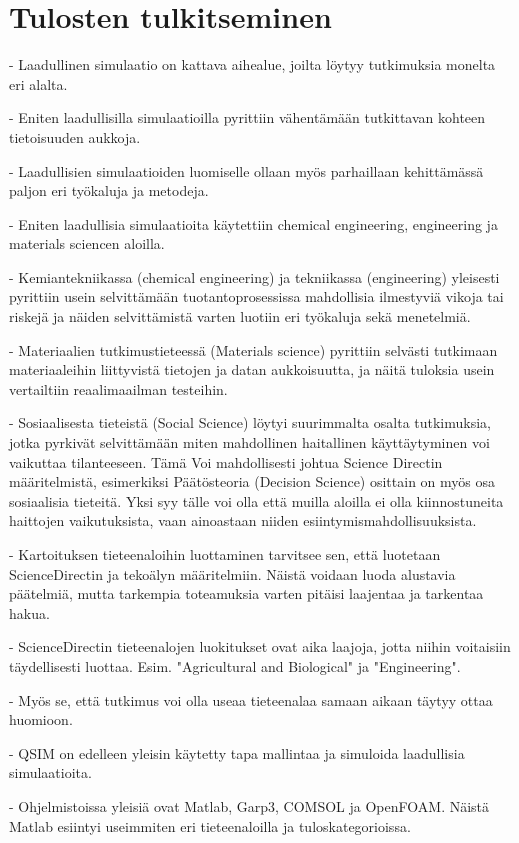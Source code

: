 \documentclass[utf8]{gradu3}
\begin{document}
\chapter{Tulosten tulkitseminen}
- Laadullinen simulaatio on kattava aihealue, joilta löytyy tutkimuksia monelta eri alalta.

- Eniten laadullisilla simulaatioilla pyrittiin vähentämään tutkittavan kohteen tietoisuuden
aukkoja.

- Laadullisien simulaatioiden luomiselle ollaan myös parhaillaan kehittämässä paljon eri 
työkaluja ja metodeja.

- Eniten laadullisia simulaatioita käytettiin chemical engineering, engineering ja materials sciencen aloilla.

- Kemiantekniikassa (chemical engineering) ja tekniikassa (engineering) yleisesti 
pyrittiin usein selvittämään tuotantoprosessissa  mahdollisia ilmestyviä vikoja tai riskejä 
ja näiden selvittämistä varten luotiin eri työkaluja sekä menetelmiä.

- Materiaalien tutkimustieteessä (Materials science) pyrittiin selvästi 
tutkimaan materiaaleihin  liittyvistä tietojen ja datan aukkoisuutta, ja näitä tuloksia usein 
vertailtiin reaalimaailman testeihin.

- Sosiaalisesta tieteistä (Social Science) löytyi suurimmalta osalta tutkimuksia, 
jotka pyrkivät selvittämään miten mahdollinen haitallinen käyttäytyminen voi vaikuttaa
tilanteeseen. Tämä Voi mahdollisesti johtua Science Directin määritelmistä, esimerkiksi
Päätösteoria (Decision Science) osittain on myös osa sosiaalisia tieteitä. 
Yksi syy tälle voi olla että muilla aloilla ei olla kiinnostuneita haittojen vaikutuksista,
vaan ainoastaan niiden esiintymismahdollisuuksista.

- Kartoituksen tieteenaloihin luottaminen tarvitsee sen, että luotetaan ScienceDirectin 
ja tekoälyn määritelmiin. Näistä voidaan luoda alustavia päätelmiä, mutta tarkempia
toteamuksia varten pitäisi laajentaa ja tarkentaa hakua.

- ScienceDirectin tieteenalojen luokitukset ovat aika laajoja, jotta niihin voitaisiin 
täydellisesti luottaa. Esim. "Agricultural and Biological" ja "Engineering".

- Myös se, että tutkimus voi olla useaa tieteenalaa samaan aikaan täytyy ottaa huomioon.

- QSIM on edelleen yleisin käytetty tapa mallintaa ja simuloida laadullisia simulaatioita.

- Ohjelmistoissa yleisiä ovat Matlab, Garp3, COMSOL ja OpenFOAM. Näistä Matlab esiintyi 
useimmiten eri tieteenaloilla ja tuloskategorioissa.
\end{document}

